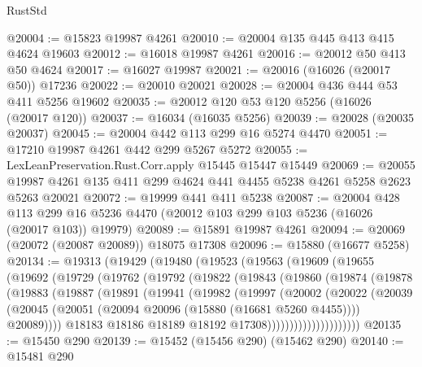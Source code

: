 \begin{lexlean}{RustStd}
\begin{coremodule}
@20004 := @15823 @19987 @4261
@20010 := @20004 @135 @445 @413 @415 @4624 @19603
@20012 := @16018 @19987 @4261
@20016 := @20012 @50 @413 @50 @4624
@20017 := @16027 @19987
@20021 := @20016 (@16026 (@20017 @50)) @17236
@20022 := @20010 @20021
@20028 := @20004 @436 @444 @53 @411 @5256 @19602
@20035 := @20012 @120 @53 @120 @5256 (@16026 (@20017 @120))
@20037 := @16034 (@16035 @5256)
@20039 := @20028 (@20035 @20037)
@20045 := @20004 @442 @113 @299 @16 @5274 @4470
@20051 := @17210 @19987 @4261 @442 @299 @5267 @5272
@20055 := LexLeanPreservation.Rust.Corr.apply @15445 @15447 @15449
@20069 := @20055 @19987 @4261 @135 @411 @299 @4624 @441 @4455 @5238 @4261 @5258 @2623 @5263 @20021
@20072 := @19999 @441 @411 @5238
@20087 := @20004
    @428
    @113
    @299
    @16
    @5236
    @4470
    (@20012 @103 @299 @103 @5236 (@16026 (@20017 @103)) @19979)
@20089 := @15891 @19987 @4261
@20094 := @20069 (@20072 (@20087 @20089)) @18075 @17308
@20096 := @15880 (@16677 @5258)
@20134 := @19313
    (@19429
      (@19480
        (@19523
          (@19563
            (@19609
              (@19655
                (@19692
                  (@19729
                    (@19762
                      (@19792
                        (@19822
                          (@19843
                            (@19860
                              (@19874
                                (@19878
                                  (@19883
                                    (@19887
                                      (@19891
                                        (@19941
                                          (@19982
                                            (@19997
                                              (@20002
                                                (@20022
                                                  (@20039
                                                    (@20045
                                                      (@20051
                                                        (@20094
                                                          @20096
                                                          (@15880 (@16681 @5260 @4455))))
                                                      @20089))))
                                              @18183
                                              @18186
                                              @18189
                                              @18192
                                              @17308)))))))))))))))))))))
@20135 := @15450 @290
@20139 := @15452 (@15456 @290) (@15462 @290)
@20140 := @15481 @290

\end{coremodule}
\end{lexlean}
